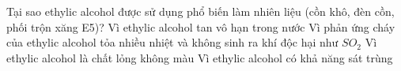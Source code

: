 \begin{ex}%
	Tại sao ethylic alcohol được sử dụng phổ biến làm nhiên liệu (cồn khô, đèn cồn, phối trộn xăng E5)?
	\choice
	{Vì ethylic alcohol tan vô hạn trong nước}
	{\True Vì phản ứng cháy của ethylic alcohol tỏa nhiều nhiệt và không sinh ra khí độc hại như $SO_2$}
	{Vì ethylic alcohol là chất lỏng không màu}
	{Vì ethylic alcohol có khả năng sát trùng}
\end{ex}